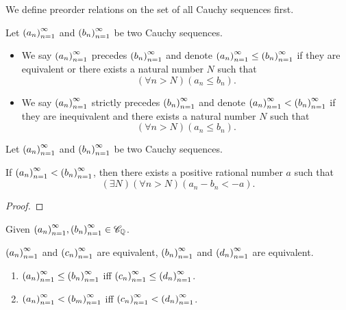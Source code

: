 We define preorder relations on the set of all Cauchy sequences first.

\begin{definition}
    Let ${\left({a_{n}}\right)}^{\infty}_{n=1}$ and ${\left({b_{n}}\right)}^{\infty}_{n=1}$ be two Cauchy sequences.

    \begin{itemize}
        \item We say ${\left({a_{n}}\right)}^{\infty}_{n=1}$ precedes ${\left({b_{n}}\right)}^{\infty}_{n=1}$ and denote ${\left({a_{n}}\right)}^{\infty}_{n=1}\le{\left({b_{n}}\right)}^{\infty}_{n=1}$ if they are equivalent or there exists a natural number $N$ such that
              \[
                  (\forall n > N)(a_{n}\le b_{n}).
              \]
        \item We say ${\left({a_{n}}\right)}^{\infty}_{n=1}$ strictly precedes ${\left({b_{n}}\right)}^{\infty}_{n=1}$ and denote ${\left({a_{n}}\right)}^{\infty}_{n=1} < {\left({b_{n}}\right)}^{\infty}_{n=1}$ if they are inequivalent and there exists a natural number $N$ such that
              \[
                  (\forall n > N)(a_{n}\le b_{n}).
              \]
    \end{itemize}
\end{definition}


\begin{theorem}
    Let ${\left({a_{n}}\right)}^{\infty}_{n=1}$ and ${\left({b_{n}}\right)}^{\infty}_{n=1}$ be two Cauchy sequences.

    If ${\left({a_{n}}\right)}^{\infty}_{n=1} < {\left({b_{n}}\right)}^{\infty}_{n=1}$, then there exists a positive rational number $a$ such that
    \[
        (\exists N)(\forall n > N)(a_{n} - b_{n} < -a).
    \]
\end{theorem}

\begin{proof}
\end{proof}

\begin{theorem}\label{theorem:chapter1:equivalent-cauchy-sequences-and-order}
    Given ${\left({a_{n}}\right)}^{\infty}_{n=1}, {\left({b_{n}}\right)}^{\infty}_{n=1}\in\mathscr{C}_{\mathbb{Q}}$.

    ${\left({a_{n}}\right)}^{\infty}_{n=1}$ and ${\left({c_{n}}\right)}^{\infty}_{n=1}$ are equivalent, ${\left({b_{n}}\right)}^{\infty}_{n=1}$ and ${\left({d_{n}}\right)}^{\infty}_{n=1}$ are equivalent.

    \begin{enumerate}[label={(\roman*)}]
        \item ${\left({a_{n}}\right)}^{\infty}_{n=1}\le{\left({b_{n}}\right)}^{\infty}_{n=1}$ iff ${\left({c_{n}}\right)}^{\infty}_{n=1}\le{\left({d_{n}}\right)}^{\infty}_{n=1}$.
        \item ${\left({a_{n}}\right)}^{\infty}_{n=1} < {\left({b_{m}}\right)}^{\infty}_{n=1}$ iff ${\left({c_{n}}\right)}^{\infty}_{n=1} < {\left({d_{n}}\right)}^{\infty}_{n=1}$.
    \end{enumerate}
\end{theorem}


